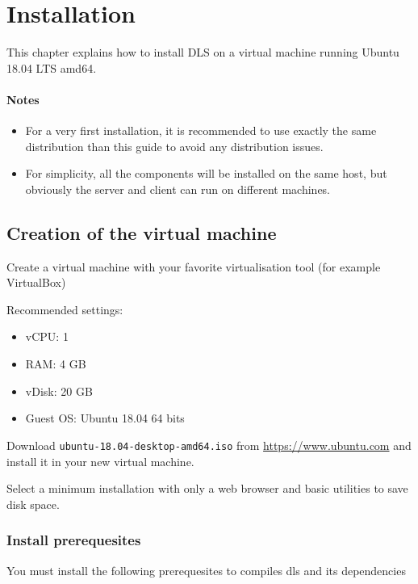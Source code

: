 \chapter{Installation}


This chapter explains how to install DLS on a virtual machine running Ubuntu 18.04 LTS amd64.


\subsubsection{Notes}

\begin{itemize}
\item For a very first installation, it is recommended to use exactly the same
  distribution than this guide to avoid any distribution issues.
\item For simplicity, all the components will be installed on the same host,
  but obviously the server and client can run on different machines.
\end{itemize}



\section{Creation of the virtual machine}


Create a virtual machine with your favorite virtualisation tool (for example VirtualBox)


Recommended settings:
\begin{itemize}
\item vCPU: 1
\item RAM: 4 GB
\item vDisk: 20 GB
\item Guest OS: Ubuntu 18.04 64 bits
\end{itemize}


Download \texttt{ubuntu-18.04-desktop-amd64.iso} from
\url{https://www.ubuntu.com}
and install it in your new virtual machine.

Select a minimum installation with only a web browser and basic utilities
to save disk space.



\subsection{Install prerequesites}


You must install the following prerequesites to compiles dls and its dependencies

